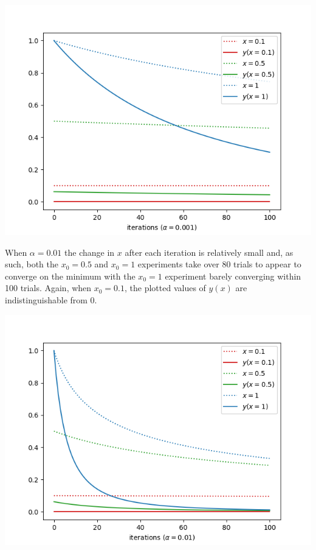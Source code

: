 \documentclass[12pt]{article}
\begin{document}
\begin{center}
    \includegraphics[scale=0.55]{figs/b/b_iii_1.png}
\end{center}

When $\alpha = 0.01$ the change in $x$ after each iteration is relatively small and, as such, both the $x_0=0.5$ and $x_0=1$ experiments take over 80 trials to appear to converge on the minimum with the $x_0=1$ experiment barely converging within 100 trials. Again, when $x_0=0.1$, the plotted values of $y(x)$ are indistinguishable from 0.

\begin{center}
    \includegraphics[scale=0.55]{figs/b/b_iii_2.png}
\end{center}
\end{document}
